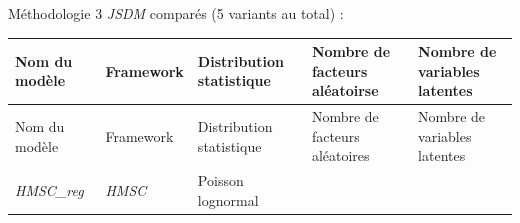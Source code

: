 \documentclass[%
]{beamer}
\begin{document}
	\begin{frame}{Méthodologie}
	3 \emph{JSDM} comparés (5 variants au total) :
	\begin{scriptsize}
		\begin{longtable}[]{lllll}
		\toprule
		\begin{minipage}[b]{0.11\columnwidth}\raggedright
		Nom du modèle\strut
		\end{minipage} & \begin{minipage}[b]{0.09\columnwidth}\raggedright
		Framework\strut
		\end{minipage} & \begin{minipage}[b]{0.19\columnwidth}\raggedright
		Distribution statistique\strut
		\end{minipage} & \begin{minipage}[b]{0.24\columnwidth}\raggedright
		Nombre de facteurs aléatoirse\strut
		\end{minipage} & \begin{minipage}[b]{0.22\columnwidth}\raggedright
		Nombre de variables latentes\strut
		\end{minipage}\tabularnewline
		\toprule
		\endfirsthead
		\toprule
		\begin{minipage}[b]{0.11\columnwidth}\raggedright
		Nom du modèle\strut
		\end{minipage} & \begin{minipage}[b]{0.09\columnwidth}\raggedright
		Framework\strut
		\end{minipage} & \begin{minipage}[b]{0.19\columnwidth}\raggedright
		Distribution statistique\strut
		\end{minipage} & \begin{minipage}[b]{0.24\columnwidth}\raggedright
		Nombre de facteurs aléatoires\strut
		\end{minipage} & \begin{minipage}[b]{0.22\columnwidth}\raggedright
		Nombre de variables latentes\strut
		\end{minipage}\tabularnewline
		\toprule
		\endhead
		\begin{minipage}[t]{0.11\columnwidth}\raggedright
		\emph{HMSC\_reg}\strut
		\end{minipage} & \begin{minipage}[t]{0.09\columnwidth}\raggedright
		\emph{HMSC}\strut
		\end{minipage} & \begin{minipage}[t]{0.19\columnwidth}\raggedright
		Poisson lognormal\strut
		\end{minipage} & \begin{minipage}[t]{0.24\columnwidth}\raggedright

\end{minipage}
\end{longtable}
\end{scriptsize}
\end{frame}
\end{document}
